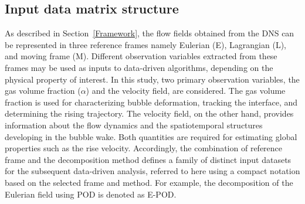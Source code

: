 \documentclass[a4paper,fleqn]{cas-sc}
\begin{document}
	\subsection{Input data matrix structure}
	
	As described in Section~\ref{Framework}, the flow fields obtained from the DNS can be represented in three reference frames namely Eulerian (E), Lagrangian (L), and moving frame (M). Different observation variables extracted from these frames may be used as inputs to data-driven algorithms, depending on the physical property of interest. In this study, two primary observation variables, the gas volume fraction ($\alpha$) and the velocity field, are considered. The gas volume fraction is used for characterizing bubble deformation, tracking the interface, and determining the rising trajectory. The velocity field, on the other hand, provides information about the flow dynamics and the spatiotemporal structures developing in the bubble wake. Both quantities are required for estimating global properties such as the rise velocity. 	Accordingly, the combination of reference frame and the decomposition method defines a family of distinct input datasets for the subsequent data-driven analysis, referred to here using a compact notation based on the selected frame and method. For example, the decomposition of the Eulerian field using POD is denoted as E-POD.
	
\end{document}

